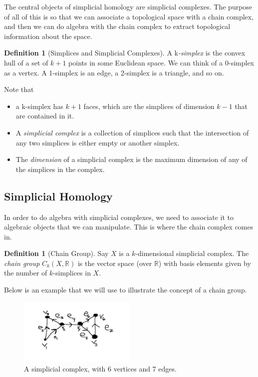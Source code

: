 \documentclass[12pt]{article}
\theoremstyle{plain}
\theoremstyle{definition}
\newtheorem{definition}[thm]{Definition}
\begin{document}
The central objects of simplicial homology are simplicial complexes. The purpose of all of this is so that we can associate a
topological space with a chain complex, and then we can do algebra with the chain complex to extract topological information about the space.


\begin{definition}[Simplices and Simplicial Complexes]

A k\textit{-simplex} is the convex hull of a set of $k+1$ points in some Euclidean space. We can think of a 0-simplex as a
  vertex. A 1-simplex is an edge, a 2-simplex is a triangle, and so on. 

  Note that \begin{itemize}
    \item a k-simplex has $k+1$ faces, which are the simplices of dimension $k-1$ that are
  contained in it.

    \item A \textit{simplicial complex} is a collection of simplices such that the intersection of any two simplices is either empty or
another simplex.

    \item The \textit{dimension} of a simplicial complex is the maximum dimension of any of the simplices in the complex. 

      \end{itemize}

\end{definition}

\subsection{Simplicial Homology}

In order to do algebra with simplicial complexes, we need to associate it to algebraic objects that
we can manipulate. This is where the chain complex comes in.

\begin{definition}[Chain Group]  Say $X$ is a $k$-dimensional simplicial complex. The \textit{chain group} $C_k(X,\mathbb{R})$
is the vector space (over $\mathbb{R}$) with basis elements given by the number of $k$-simplices in $X$.
\end{definition}

Below is an example that we will use to illustrate the concept of a chain group.

\begin{figure}[ht]
  \begin{center}
      \includegraphics[width=0.5\textwidth]{Simp_Cx.jpg}
  \end{center}
\caption{A simplicial complex, with 6 vertices and 7 edges.}
\end{figure}
\end{document}
